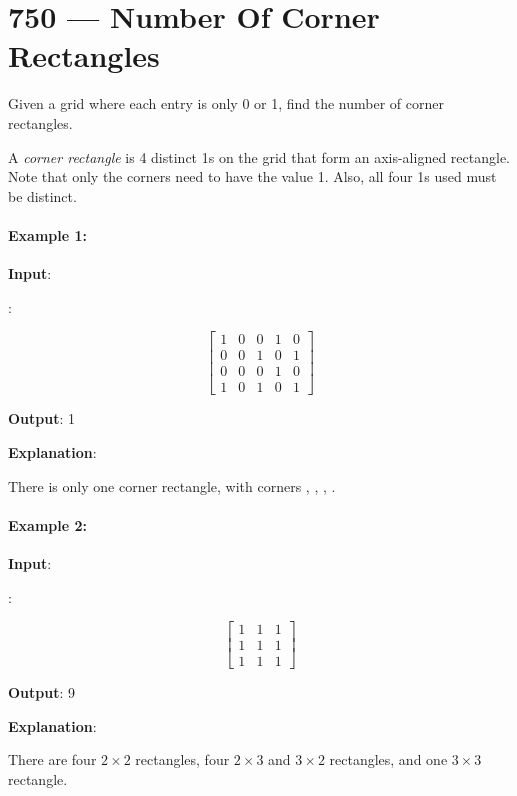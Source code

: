 \section{750 --- Number Of Corner Rectangles}
Given a grid where each entry is only 0 or 1, find the number of corner rectangles.

A \textit{corner rectangle} is 4 distinct 1s on the grid that form an axis-aligned rectangle. Note that only the corners need to have the value 1. Also, all four 1s used must be distinct.
 

\paragraph{Example 1:}

\begin{flushleft}
\textbf{Input}: 

:

\[
\begin{bmatrix}
1 & 0 & 0 & 1 & 0 \\
0 & 0 & 1 & 0 & 1 \\
0 & 0 & 0 & 1 & 0 \\
1 & 0 & 1 & 0 & 1
\end{bmatrix}
\] 


\textbf{Output}: 1

\textbf{Explanation}: 

There is only one corner rectangle, with corners , , , .



\end{flushleft} 

\paragraph{Example 2:}
\begin{flushleft}


\textbf{Input}: 

:

\[
\begin{bmatrix}
1 & 1 & 1\\
1 & 1 & 1\\
1 & 1 & 1
\end{bmatrix}
\] 

\textbf{Output}: 9

\textbf{Explanation}: 

There are four $2\times2$ rectangles, four $2\times 3$ and $3\times 2$ rectangles, and one $3\times3$ rectangle.

\end{flushleft} 

